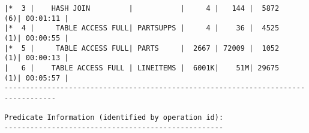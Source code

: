 \documentclass[11pt,a4paper,parskip=half]{scrartcl}
\begin{document}
\begin{lstlisting}
|*  3 |    HASH JOIN         |           |     4 |   144 |  5872   (6)| 00:01:11 |                                                                                                                                                                                                                           
|*  4 |     TABLE ACCESS FULL| PARTSUPPS |     4 |    36 |  4525   (1)| 00:00:55 |                                                                                                                                                                                                                           
|*  5 |     TABLE ACCESS FULL| PARTS     |  2667 | 72009 |  1052   (1)| 00:00:13 |                                                                                                                                                                                                                           
|   6 |    TABLE ACCESS FULL | LINEITEMS |  6001K|    51M| 29675   (1)| 00:05:57 |                                                                                                                                                                                                                           
----------------------------------------------------------------------------------                                                                                                                                                                                                                           
                                                                                                                                                                                                                                                                                                             
Predicate Information (identified by operation id):                                                                                                                                                                                                                                                          
---------------------------------------------------                                                                                                                                                                                                                                                          
                                                                                                                                                                                                                                                                                                             

\end{lstlisting}
\end{document}
